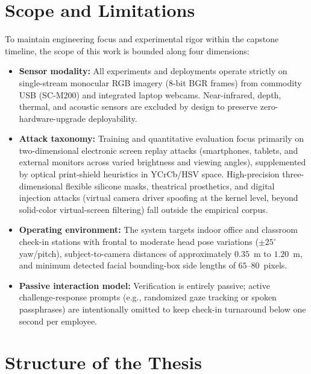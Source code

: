 \section{Scope and Limitations}
\label{sec:scope_limitations}

To maintain engineering focus and experimental rigor within the capstone timeline, the scope of this work is bounded along four dimensions:
\begin{itemize}
    \item \textbf{Sensor modality:} All experiments and deployments operate strictly on single-stream monocular RGB imagery ($8$-bit BGR frames) from commodity USB (SC-M200) and integrated laptop webcams. Near-infrared, depth, thermal, and acoustic sensors are excluded by design to preserve zero-hardware-upgrade deployability.
    \item \textbf{Attack taxonomy:} Training and quantitative evaluation focus primarily on two-dimensional electronic screen replay attacks (smartphones, tablets, and external monitors across varied brightness and viewing angles), supplemented by optical print-shield heuristics in YCrCb/HSV space. High-precision three-dimensional flexible silicone masks, theatrical prosthetics, and digital injection attacks (virtual camera driver spoofing at the kernel level, beyond solid-color virtual-screen filtering) fall outside the empirical corpus.
    \item \textbf{Operating environment:} The system targets indoor office and classroom check-in stations with frontal to moderate head pose variations ($\pm 25^\circ$ yaw/pitch), subject-to-camera distances of approximately $0.35$~m to $1.20$~m, and minimum detected facial bounding-box side lengths of $65$--$80$~pixels.
    \item \textbf{Passive interaction model:} Verification is entirely passive; active challenge-response prompts (e.g., randomized gaze tracking or spoken passphrases) are intentionally omitted to keep check-in turnaround below one second per employee.
\end{itemize}

\section{Structure of the Thesis}
\label{sec:thesis_structure}

